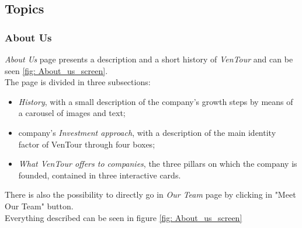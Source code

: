 \documentclass[../../DD.tex]{subsubfiles}
\begin{document}
\newpage
\subsection{Topics}
	\subsubsection{About Us}
		\textit{About Us} page presents a description and a short history of \textit{VenTour} and can be seen \ref{fig: About_us_screen}.\\
        The page is divided in three subsections: 
        \begin{itemize}
            \item \textit{History}, with a small description of the company's growth steps by means of a carousel of images and text;
            \item company's \textit{Investment approach}, with a description of the main identity factor of VenTour through four boxes;
            \item \textit{What VenTour offers to companies}, the three pillars on which the company is founded, contained in three interactive cards.
        \end{itemize}
        There is also the possibility to directly go in \textit{Our Team} page by clicking in "Meet Our Team" button.\\
        Everything described can be seen in figure \ref{fig: About_us_screen}
  
\end{document}
